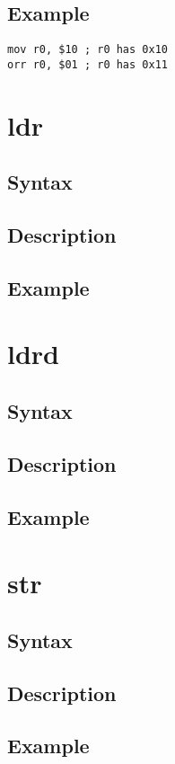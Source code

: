 \documentclass[11pt]{scrartcl}
\begin{document}
\subsection{Example}
\begin{verbatim}
mov r0, $10 ; r0 has 0x10
orr r0, $01 ; r0 has 0x11
\end{verbatim}

\section{ldr}
\subsection{Syntax}
\subsection{Description}
\subsection{Example}

\section{ldrd}
\subsection{Syntax}
\subsection{Description}
\subsection{Example}

\section{str}
\subsection{Syntax}
\subsection{Description}
\subsection{Example}
\end{document}
